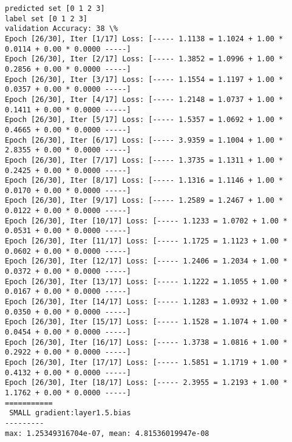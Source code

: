 \documentclass[11pt]{article}
\begin{document}
    \begin{Verbatim}[commandchars=\\\{\}]
predicted set [0 1 2 3]
label set [0 1 2 3]
validation Accuracy: 38 \%
Epoch [26/30], Iter [1/17] Loss: [----- 1.1138 = 1.1024 + 1.00 * 0.0114 + 0.00 * 0.0000 -----]
Epoch [26/30], Iter [2/17] Loss: [----- 1.3852 = 1.0996 + 1.00 * 0.2856 + 0.00 * 0.0000 -----]
Epoch [26/30], Iter [3/17] Loss: [----- 1.1554 = 1.1197 + 1.00 * 0.0357 + 0.00 * 0.0000 -----]
Epoch [26/30], Iter [4/17] Loss: [----- 1.2148 = 1.0737 + 1.00 * 0.1411 + 0.00 * 0.0000 -----]
Epoch [26/30], Iter [5/17] Loss: [----- 1.5357 = 1.0692 + 1.00 * 0.4665 + 0.00 * 0.0000 -----]
Epoch [26/30], Iter [6/17] Loss: [----- 3.9359 = 1.1004 + 1.00 * 2.8355 + 0.00 * 0.0000 -----]
Epoch [26/30], Iter [7/17] Loss: [----- 1.3735 = 1.1311 + 1.00 * 0.2425 + 0.00 * 0.0000 -----]
Epoch [26/30], Iter [8/17] Loss: [----- 1.1316 = 1.1146 + 1.00 * 0.0170 + 0.00 * 0.0000 -----]
Epoch [26/30], Iter [9/17] Loss: [----- 1.2589 = 1.2467 + 1.00 * 0.0122 + 0.00 * 0.0000 -----]
Epoch [26/30], Iter [10/17] Loss: [----- 1.1233 = 1.0702 + 1.00 * 0.0531 + 0.00 * 0.0000 -----]
Epoch [26/30], Iter [11/17] Loss: [----- 1.1725 = 1.1123 + 1.00 * 0.0602 + 0.00 * 0.0000 -----]
Epoch [26/30], Iter [12/17] Loss: [----- 1.2406 = 1.2034 + 1.00 * 0.0372 + 0.00 * 0.0000 -----]
Epoch [26/30], Iter [13/17] Loss: [----- 1.1222 = 1.1055 + 1.00 * 0.0167 + 0.00 * 0.0000 -----]
Epoch [26/30], Iter [14/17] Loss: [----- 1.1283 = 1.0932 + 1.00 * 0.0350 + 0.00 * 0.0000 -----]
Epoch [26/30], Iter [15/17] Loss: [----- 1.1528 = 1.1074 + 1.00 * 0.0454 + 0.00 * 0.0000 -----]
Epoch [26/30], Iter [16/17] Loss: [----- 1.3738 = 1.0816 + 1.00 * 0.2922 + 0.00 * 0.0000 -----]
Epoch [26/30], Iter [17/17] Loss: [----- 1.5851 = 1.1719 + 1.00 * 0.4132 + 0.00 * 0.0000 -----]
Epoch [26/30], Iter [18/17] Loss: [----- 2.3955 = 1.2193 + 1.00 * 1.1762 + 0.00 * 0.0000 -----]
===========
 SMALL gradient:layer1.5.bias
---------
max: 1.25349316704e-07, mean: 4.81536019947e-08

    \end{Verbatim}

    \begin{center}
    \end{center}
    { \hspace*{\fill} \\}
    
    \begin{center}
    \end{center}
    { \hspace*{\fill} \\}
    
\end{document}
